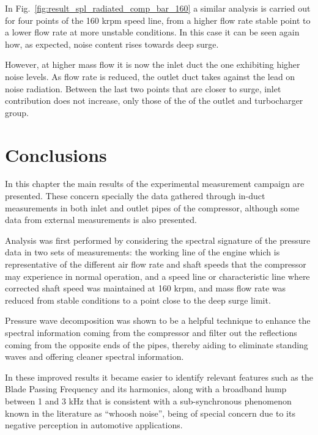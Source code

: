 In Fig.~\ref{fig:result_spl_radiated_comp_bar_160} a similar analysis is carried out for four points of the 160 krpm speed line, from a higher flow rate stable point to a lower flow rate at more unstable conditions. In this case it can be seen again how, as expected, noise content rises towards deep surge.

However, at higher mass flow it is now the inlet duct the one exhibiting higher noise levels. As flow rate is reduced, the outlet duct takes against the lead on noise radiation. Between the last two points that are closer to surge, inlet contribution does not increase, only those of the of the outlet and turbocharger group.


\section{Conclusions}

In this chapter the main results of the experimental measurement campaign are presented. These concern specially the data gathered through in-duct measurements in both inlet and outlet pipes of the compressor, although some data from external measurements is also presented.

Analysis was first performed by considering the spectral signature of the pressure data in two sets of measurements: the working line of the engine which is representative of the different air flow rate and shaft speeds that the compressor may experience in normal operation, and a speed line or characteristic line where corrected shaft speed was maintained at 160 krpm, and mass flow rate was reduced from stable conditions to a point close to the deep surge limit.

Pressure wave decomposition was shown to be a helpful technique to enhance the spectral information coming from the compressor and filter out the reflections coming from the opposite ends of the pipes, thereby aiding to eliminate standing waves and offering  cleaner spectral information.

In these improved results it became easier to identify relevant features such as the Blade Passing Frequency and its harmonics, along with a broadband hump between 1 and 3 kHz that is consistent with a sub-synchronous phenomenon known in the literature as ``whoosh noise'', being of special concern due to its negative perception in automotive applications.


